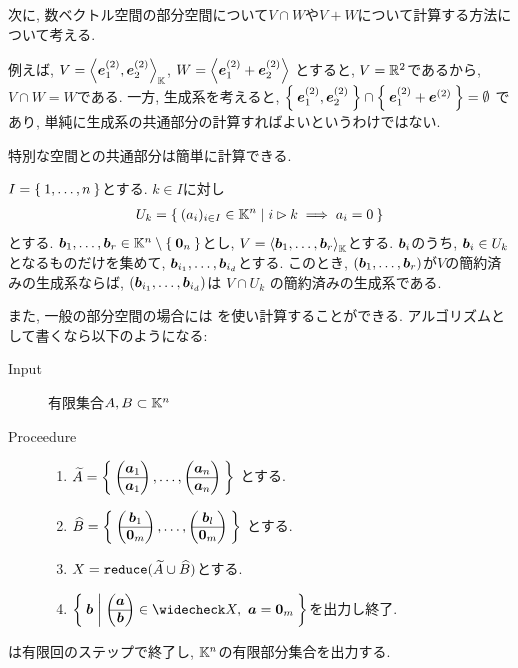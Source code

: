 次に, 数ベクトル空間の部分空間について$V\cap W$や$V+W$について計算する方法について考える.

例えば,
$V=\Braket{\boldsymbol{e}^{(2)}_1,\boldsymbol{e}_2^{(2)}}_{\mathbb{K}}$,
$W=\Braket{\boldsymbol{e}^{(2)}_1+\boldsymbol{e}^{(2)}_2}$
とすると,
$V=\mathbb{R}^2$であるから, $V\cap W=W$である.
一方, 生成系を考えると,
$\Set{\boldsymbol{e}^{(2)}_1,\boldsymbol{e}_2^{(2)}}\cap \Set{\boldsymbol{e}^{(2)}_1+\boldsymbol{e}^{(2)}}=\emptyset$
であり,
単純に生成系の共通部分の計算すればよいというわけではない.
  
特別な空間との共通部分は簡単に計算できる.
\begin{prop}
  $I=\Set{1,\ldots, n}$とする.
  $k\in I$に対し
  \begin{align*}
    U_k=\Set{(a_i)_{i\in I}\in\mathbb{K}^n| i\rhd k \implies a_i=0}
  \end{align*}
  とする.
  $\boldsymbol{b}_1,\ldots,\boldsymbol{b}_r \in \mathbb{K}^n \setminus\Set{\boldsymbol{0}_n}$とし,
  $V=\Braket{\boldsymbol{b}_1,\ldots,\boldsymbol{b}_r}_{\mathbb{K}}$とする.
  $\boldsymbol{b}_i$のうち, $\boldsymbol{b}_i\in U_k$となるものだけを集めて,
  $\boldsymbol{b}_{i_1},\ldots, \boldsymbol{b}_{i_d}$とする.
  このとき,
  $(\boldsymbol{b}_1,\ldots,\boldsymbol{b}_r)$が$V$の簡約済みの生成系ならば,
  $(\boldsymbol{b}_{i_1},\ldots, \boldsymbol{b}_{i_d})$は
  $V\cap U_k$
  の簡約済みの生成系である.
\end{prop}

また,
一般の部分空間の場合には
を使い計算することができる.
アルゴリズムとして書くなら以下のようになる:
\begin{algorithm}\label{alg:intersection}\makebox{}
\begin{description}
\item[Input]
  有限集合$A,B\subset \mathbb{K}^n$
\item[Proceedure]\makebox{}
  \begin{enumerate}
  \item
    $\widetilde A=\Set{\begin{pmatrix}\boldsymbol{a}_1\\\hline\boldsymbol{a}_1\end{pmatrix},\ldots,\begin{pmatrix}\boldsymbol{a}_n\\\hline\boldsymbol{a}_n\end{pmatrix}}$
    とする.
  \item
    $\widehat B=\Set{\begin{pmatrix}\boldsymbol{b}_1\\\hline\boldsymbol{0}_m\end{pmatrix},\ldots,\begin{pmatrix}\boldsymbol{b}_l\\\hline\boldsymbol{0}_m\end{pmatrix}}$
    とする.
  \item $X=\operatorname{\texttt{reduce}}(\widetilde A\cup \widehat B)$とする.
  \item $\Set{\bbb|\begin{pmatrix}\aaa\\\hline\bbb\end{pmatrix}\in\widecheck X,\ \aaa=\zzero_m}$を出力し終了.
  \end{enumerate}
\end{description}
\end{algorithm}
\begin{prop}
  は有限回のステップで終了し,
  $\mathbb{K}^n$の有限部分集合を出力する.
\end{prop}


